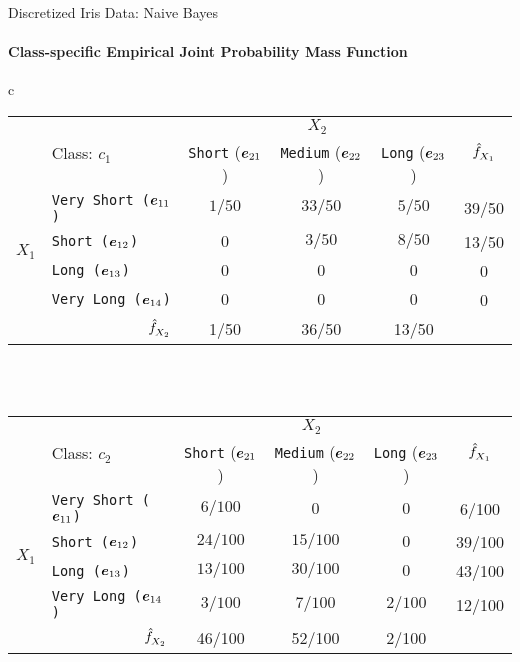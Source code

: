 \begin{frame}{Discretized Iris Data: Naive Bayes}
\framesubtitle{Class-specif\/{i}c Empirical Joint Probability Mass Function}
\label{tab:class:prob:jepmf}%
\footnotesize{
{\begin{tabular}{c}
  \renewcommand{\arraystretch}{1.1}\begin{tabular}{|c|l||c|c|c||c|}
    \hline
    & \multirow{2}{*}{Class: $c_1$}&\multicolumn{3}{c||}{$X_2$} &
    \multirow{2}{*}{$\kern3pt\hat{\kern-3pt f}_{\!X_1}$}\\
    \cline{3-5}
        & & {\tt Short} (${\boldsymbol e}_{21}$) & {\tt Medium} (${\boldsymbol e}_{22}$) &
        {\tt Long} (${\boldsymbol e}_{23}$) & \\
        \hline\hline
        \multirow{4}{*}{$X_1$}
        & {\tt Very Short (${\boldsymbol e}_{11}$)} &  ${1/50}$  &
        ${33/50}$  & ${5/50}$ & 39/50\\
        &{\tt Short (${\boldsymbol e}_{12}$)} & $0$
        &${3/50}$  & ${8/50}$ & 13/50\\
        &{\tt Long (${\boldsymbol e}_{13}$)} & $0$  &
        $0$   & $0$ & 0\\
        &{\tt Very Long (${\boldsymbol e}_{14}$)} & $0$  &
        $0$ & $0$ & 0\\
    \hline
    \multicolumn{2}{|r||}{$\kern3pt\hat{\kern-3pt f}_{\!X_2}$} & 1/50 & 36/50 & 13/50 & \\
    \hline
  \end{tabular}\\[12pt]\\
 \renewcommand{\arraystretch}{1.1}\begin{tabular}{|c|l||c|c|c||c|}
    \hline
    & \multirow{2}{*}{Class: $c_2$}&\multicolumn{3}{c||}{$X_2$} &
    \multirow{2}{*}{$\kern3pt\hat{\kern-3pt f}_{\!X_1}$}\\
    \cline{3-5}
        & & {\tt Short} (${\boldsymbol e}_{21}$) & {\tt Medium} (${\boldsymbol e}_{22}$) &
        {\tt Long} (${\boldsymbol e}_{23}$) & \\
        \hline\hline
        \multirow{4}{*}{$X_1$}
        & {\tt Very Short (${\boldsymbol e}_{11}$)} &  ${6/100}$  &
        ${0}$  & $0$ & 6/100\\
        &{\tt Short (${\boldsymbol e}_{12}$)} & ${24/100}$
        &${15/100}$  &      ${0}$ & 39/100\\
        &{\tt Long (${\boldsymbol e}_{13}$)} & ${13/100}$  &
        ${30/100}$   &      ${0}$ & 43/100\\
        &{\tt Very Long (${\boldsymbol e}_{14}$)} & ${3/100}$  &
        ${7/100}$       & ${2/100}$ & 12/100\\
    \hline
    \multicolumn{2}{|r||}{$\kern3pt\hat{\kern-3pt f}_{\!X_2}$} & 46/100 & 52/100 & 2/100 &\\
    \hline
  \end{tabular}\\
\end{tabular}}{}
}
\end{frame}

